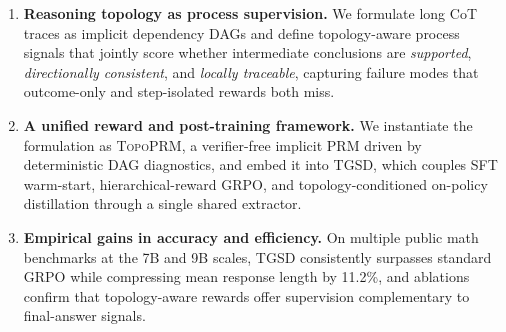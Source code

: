 \begin{enumerate}[leftmargin=*,itemsep=2pt]
    \item \textbf{Reasoning topology as process supervision.} We formulate long CoT traces as implicit dependency DAGs and define topology-aware process signals that jointly score whether intermediate conclusions are \emph{supported}, \emph{directionally consistent}, and \emph{locally traceable}, capturing failure modes that outcome-only and step-isolated rewards both miss.
    \item \textbf{A unified reward and post-training framework.} We instantiate the formulation as \textsc{TopoPRM}, a verifier-free implicit PRM driven by deterministic DAG diagnostics, and embed it into \textsc{TGSD}, which couples SFT warm-start, hierarchical-reward GRPO, and topology-conditioned on-policy distillation through a single shared extractor.
    \item \textbf{Empirical gains in accuracy and efficiency.} On multiple public math benchmarks at the 7B and 9B scales, \textsc{TGSD} consistently surpasses standard GRPO while compressing mean response length by 11.2\%, and ablations confirm that topology-aware rewards offer supervision complementary to final-answer signals.
\end{enumerate}




